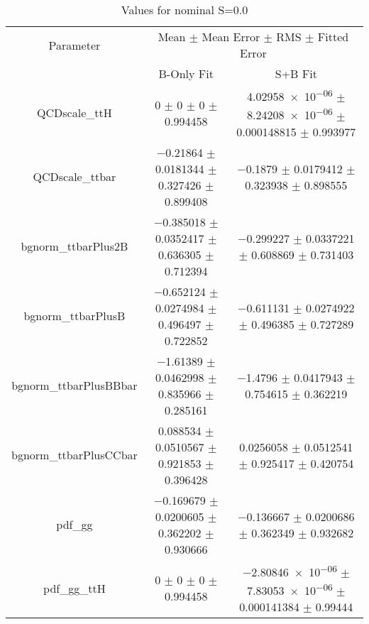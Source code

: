 \begin{table}
\centering
\caption{Values for nominal S=0.0}
\begin{tabular}{ccc}
\toprule
Parameter & \multicolumn{2}{c}{Mean $\pm$ Mean Error $\pm$ RMS $\pm$ Fitted Error}\\
 & B-Only Fit & S+B Fit\\
\midrule
QCDscale\_ttH & \num{0} $\pm$ \num{0} $\pm$ \num{0} $\pm$ \num{0.994458} & \num{4.02958e-06} $\pm$ \num{8.24208e-06} $\pm$ \num{0.000148815} $\pm$ \num{0.993977}\\
QCDscale\_ttbar & \num{-0.21864} $\pm$ \num{0.0181344} $\pm$ \num{0.327426} $\pm$ \num{0.899408} & \num{-0.1879} $\pm$ \num{0.0179412} $\pm$ \num{0.323938} $\pm$ \num{0.898555}\\
bgnorm\_ttbarPlus2B & \num{-0.385018} $\pm$ \num{0.0352417} $\pm$ \num{0.636305} $\pm$ \num{0.712394} & \num{-0.299227} $\pm$ \num{0.0337221} $\pm$ \num{0.608869} $\pm$ \num{0.731403}\\
bgnorm\_ttbarPlusB & \num{-0.652124} $\pm$ \num{0.0274984} $\pm$ \num{0.496497} $\pm$ \num{0.722852} & \num{-0.611131} $\pm$ \num{0.0274922} $\pm$ \num{0.496385} $\pm$ \num{0.727289}\\
bgnorm\_ttbarPlusBBbar & \num{-1.61389} $\pm$ \num{0.0462998} $\pm$ \num{0.835966} $\pm$ \num{0.285161} & \num{-1.4796} $\pm$ \num{0.0417943} $\pm$ \num{0.754615} $\pm$ \num{0.362219}\\
bgnorm\_ttbarPlusCCbar & \num{0.088534} $\pm$ \num{0.0510567} $\pm$ \num{0.921853} $\pm$ \num{0.396428} & \num{0.0256058} $\pm$ \num{0.0512541} $\pm$ \num{0.925417} $\pm$ \num{0.420754}\\
pdf\_gg & \num{-0.169679} $\pm$ \num{0.0200605} $\pm$ \num{0.362202} $\pm$ \num{0.930666} & \num{-0.136667} $\pm$ \num{0.0200686} $\pm$ \num{0.362349} $\pm$ \num{0.932682}\\
pdf\_gg\_ttH & \num{0} $\pm$ \num{0} $\pm$ \num{0} $\pm$ \num{0.994458} & \num{-2.80846e-06} $\pm$ \num{7.83053e-06} $\pm$ \num{0.000141384} $\pm$ \num{0.99444}\\
\bottomrule
\end{tabular}
\end{table}